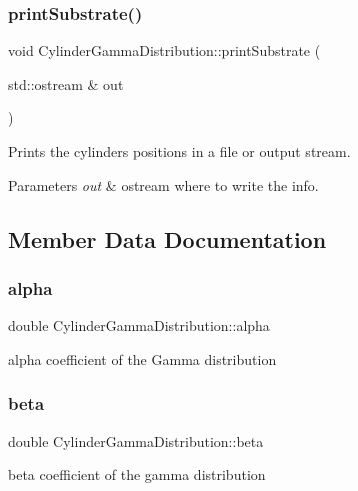 \subsubsection{\texorpdfstring{print\+Substrate()}{printSubstrate()}}
{\footnotesize\ttfamily void Cylinder\+Gamma\+Distribution\+::print\+Substrate (\begin{DoxyParamCaption}\item[{std\+::ostream \&}]{out }\end{DoxyParamCaption})}



Prints the cylinders positions in a file or output stream. 


\begin{DoxyParams}{Parameters}
{\em out} & ostream where to write the info. \\
\hline
\end{DoxyParams}


\subsection{Member Data Documentation}
\mbox{\label{class_cylinder_gamma_distribution_a8cae528f51692ed05049e4ea06c63722}} 
\subsubsection{\texorpdfstring{alpha}{alpha}}
{\footnotesize\ttfamily double Cylinder\+Gamma\+Distribution\+::alpha}

alpha coefficient of the Gamma distribution \mbox{\label{class_cylinder_gamma_distribution_a601a42ef7bacbf9696229efbd703f61e}} 
\subsubsection{\texorpdfstring{beta}{beta}}
{\footnotesize\ttfamily double Cylinder\+Gamma\+Distribution\+::beta}

beta coefficient of the gamma distribution \mbox{\label{class_cylinder_gamma_distribution_a3e8265a7ddb15d895112e02bd66fbf67}} 
